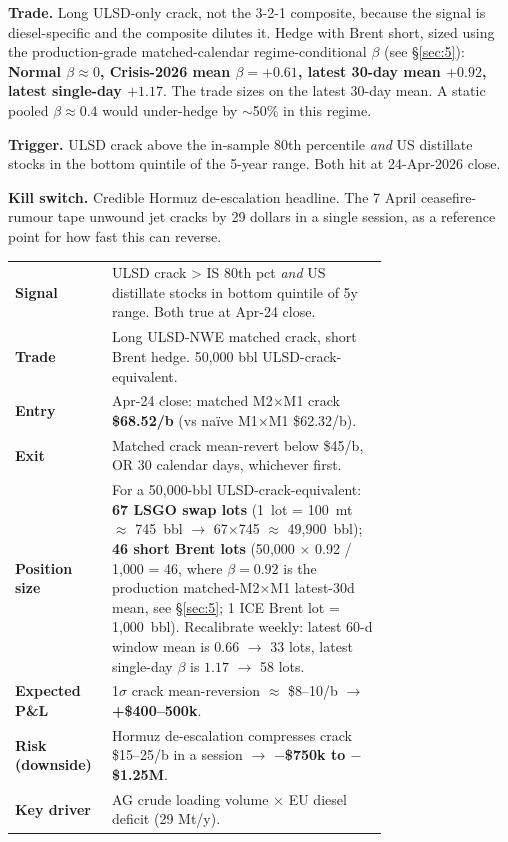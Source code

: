 \documentclass[10pt,a4paper]{article}
\begin{document}
\textbf{Trade.} Long ULSD-only crack, not the 3-2-1 composite, because the signal is diesel-specific and the composite dilutes it. Hedge with Brent short, sized using the production-grade matched-calendar regime-conditional $\beta$ (see \S\ref{sec:5}): \textbf{Normal $\beta \approx 0$, Crisis-2026 mean $\beta = +0.61$, latest 30-day mean $+0.92$, latest single-day $+1.17$}. The trade sizes on the latest 30-day mean. A static pooled $\beta \approx 0.4$ would under-hedge by $\sim$50\% in this regime.

\textbf{Trigger.} ULSD crack above the in-sample 80th percentile \emph{and} US distillate stocks in the bottom quintile of the 5-year range. Both hit at 24-Apr-2026 close.

\textbf{Kill switch.} Credible Hormuz de-escalation headline. The 7 April ceasefire-rumour tape unwound jet cracks by 29 dollars in a single session, as a reference point for how fast this can reverse.

\begin{redbox}
\footnotesize
\begin{tabular}{@{}lp{0.74\linewidth}@{}}
\textbf{Signal}            & ULSD crack > IS 80th pct \emph{and} US distillate stocks in bottom quintile of 5y range. Both true at Apr-24 close. \\
\textbf{Trade}             & Long ULSD-NWE matched crack, short Brent hedge. 50{,}000 bbl ULSD-crack-equivalent. \\
\textbf{Entry}             & Apr-24 close: matched M2$\times$M1 crack \textbf{\$68.52/b} (vs naïve M1$\times$M1 \$62.32/b). \\
\textbf{Exit}              & Matched crack mean-revert below \$45/b, OR 30 calendar days, whichever first. \\
\textbf{Position size}     & For a 50{,}000-bbl ULSD-crack-equivalent: \textbf{67 LSGO swap lots} (1~lot = 100~mt $\approx$ 745~bbl $\rightarrow$ 67$\times$745 $\approx$ 49{,}900~bbl); \textbf{46 short Brent lots} (50{,}000 $\times$ 0.92 / 1{,}000 = 46, where $\beta=0.92$ is the production matched-M2$\times$M1 latest-30d mean, see \S\ref{sec:5}; 1 ICE Brent lot = 1{,}000~bbl). Recalibrate weekly: latest 60-d window mean is $0.66$ $\rightarrow$ 33 lots, latest single-day $\beta$ is $1.17$ $\rightarrow$ 58 lots. \\
\textbf{Expected P\&L}     & 1$\sigma$ crack mean-reversion $\approx$ \$8--10/b $\rightarrow$ \textbf{+\$400--500k}. \\
\textbf{Risk (downside)}   & Hormuz de-escalation compresses crack \$15--25/b in a session $\rightarrow$ \textbf{$-$\$750k to $-$\$1.25M}. \\
\textbf{Key driver}        & AG crude loading volume $\times$ EU diesel deficit (29 Mt/y). \\
\end{tabular}
\end{redbox}
\end{document}
